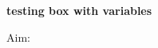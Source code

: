 \documentclass{article}
\begin{document}

{\LARGE \textbf{testing box with variables}}

{\small Aim: }
	
	\hlinepagewidth
	
  \answerbox[0.25]
  \answerbox[0.55]
  \answerbox
  \answerbox[1]
\end{document}
